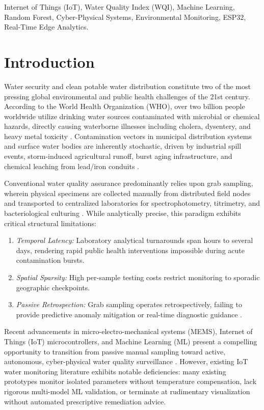 \documentclass[conference]{IEEEtran}
\begin{document}
\begin{IEEEkeywords}
Internet of Things (IoT), Water Quality Index (WQI), Machine Learning, Random Forest, Cyber-Physical Systems, Environmental Monitoring, ESP32, Real-Time Edge Analytics.
\end{IEEEkeywords}

\section{Introduction}
Water security and clean potable water distribution constitute two of the most pressing global environmental and public health challenges of the 21st century. According to the World Health Organization (WHO), over two billion people worldwide utilize drinking water sources contaminated with microbial or chemical hazards, directly causing waterborne illnesses including cholera, dysentery, and heavy metal toxicity \cite{who2022}. Contamination vectors in municipal distribution systems and surface water bodies are inherently stochastic, driven by industrial spill events, storm-induced agricultural runoff, burst aging infrastructure, and chemical leaching from lead/iron conduits \cite{epa2023}.

Conventional water quality assurance predominantly relies upon grab sampling, wherein physical specimens are collected manually from distributed field nodes and transported to centralized laboratories for spectrophotometry, titrimetry, and bacteriological culturing \cite{survey2021}. While analytically precise, this paradigm exhibits critical structural limitations:
\begin{enumerate}
    \item \textit{Temporal Latency:} Laboratory analytical turnarounds span hours to several days, rendering rapid public health interventions impossible during acute contamination bursts.
    \item \textit{Spatial Sparsity:} High per-sample testing costs restrict monitoring to sporadic geographic checkpoints.
    \item \textit{Passive Retrospection:} Grab sampling operates retrospectively, failing to provide predictive anomaly mitigation or real-time diagnostic guidance \cite{sadistap2021}.
\end{enumerate}

Recent advancements in micro-electro-mechanical systems (MEMS), Internet of Things (IoT) microcontrollers, and Machine Learning (ML) present a compelling opportunity to transition from passive manual sampling toward active, autonomous, cyber-physical water quality surveillance \cite{geetha2017}. However, existing IoT water monitoring literature exhibits notable deficiencies: many existing prototypes monitor isolated parameters without temperature compensation, lack rigorous multi-model ML validation, or terminate at rudimentary visualization without automated prescriptive remediation advice.
\end{document}
